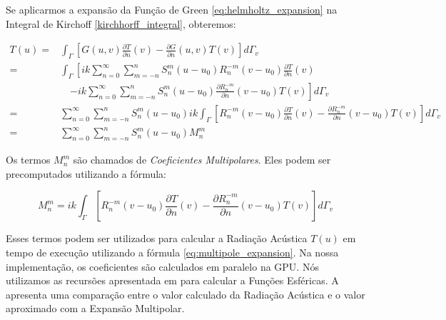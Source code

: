 Se aplicarmos a expansão da Função de Green \eqref{eq:helmholtz_expansion} na Integral de Kirchoff \eqref{kirchhorff_integral}, obteremos:

\begin{equation}\label{eq:multipole_expansion}
\begin{split}
	T(u) =& \int_{\Gamma} \left[G(u, v)\frac{\partial T}{\partial n}(v) - \frac{\partial G}{\partial n}(u, v)T(v) \right] d\Gamma_v\\
	=& \int_{\Gamma} \left[ik \sum_{n=0}^{\infty} \sum_{m=-n}^n S_n^m(u - u_0)R_n^{-m}(v - u_0)\frac{\partial T}{\partial n}(v)\right.\\
	&\quad\left. - ik \sum_{n=0}^{\infty} \sum_{m=-n}^n S_n^m(u - u_0)\frac{\partial R_n^{-m}}{\partial n}(v - u_0)T(v) \right] d\Gamma_v\\
	=& \sum_{n=0}^{\infty} \sum_{m=-n}^n S_n^m(u - u_0)ik \int_{\Gamma}\left[ R_n^{-m}(v - u_0)\frac{\partial T}{\partial n}(v) -  \frac{\partial R_n^{-m}}{\partial n}(v - u_0)T(v)\right]d\Gamma_v\\
	=& \sum_{n=0}^{\infty} \sum_{m=-n}^n S_n^m(u - u_0)M_n^m
\end{split}
\end{equation}

Os termos $M_n^m$ são chamados de \emph{Coeficientes Multipolares}. Eles podem ser precomputados utilizando a fórmula:

\begin{equation}
	M_n^m = ik \int_{\Gamma}\left[ R_n^{-m}(v - u_0)\frac{\partial T}{\partial n}(v) -  \frac{\partial R_n^{-m}}{\partial n}(v - u_0)T(v)\right]d\Gamma_v
\end{equation}

Esses termos podem ser utilizados para calcular a Radiação Acústica $T(u)$ em tempo de execução utilizando a fórmula \eqref{eq:multipole_expansion}. Na nossa implementação, os coeficientes são calculados em paralelo na GPU. Nós utilizamos as recursões apresentada em \cite{press2007numerical} para calcular a Funções Esféricas. A  apresenta uma comparação entre o valor calculado da Radiação Acústica e o valor aproximado com a Expansão Multipolar.  


